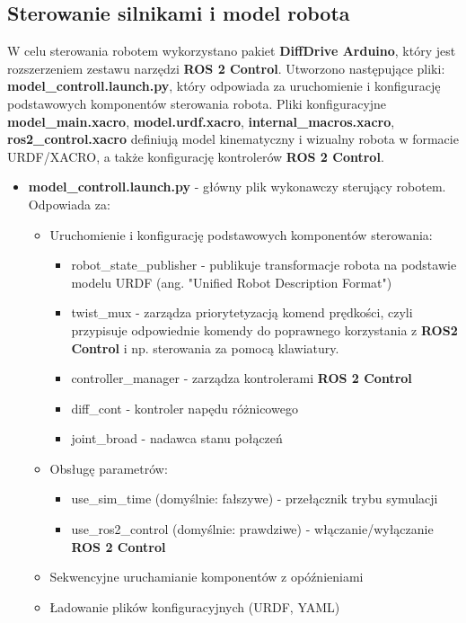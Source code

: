 \documentclass[a4paper,twoside,12pt]{book}
\begin{document}
\subsection{Sterowanie silnikami i model robota}
W celu sterowania robotem wykorzystano pakiet  \textbf{DiffDrive Arduino}, który jest rozszerzeniem zestawu narzędzi \textbf{ROS 2 Control}. \newline
Utworzono następujące pliki:
\textbf{model\_controll.launch.py}, który odpowiada za uruchomienie i konfigurację podstawowych komponentów sterowania robota. 
Pliki konfiguracyjne \textbf{model\_main.xacro}, \textbf{model.urdf.xacro}, \textbf{internal\_macros.xacro}, \textbf{ros2\_control.xacro} definiują model kinematyczny i wizualny robota w formacie URDF/XACRO, a także konfigurację kontrolerów \textbf{ROS 2 Control}.
\newpage
\begin{itemize}

	\item \textbf{model\_controll.launch.py} - główny plik wykonawczy sterujący robotem. Odpowiada za:
		\begin{itemize}
			\item Uruchomienie i konfigurację podstawowych komponentów sterowania:
			\begin{itemize}
				\item robot\_state\_publisher - publikuje transformacje robota na podstawie modelu URDF (ang. "Unified Robot Description Format")
				\item twist\_mux - zarządza priorytetyzacją komend prędkości, czyli przypisuje odpowiednie komendy do poprawnego korzystania z \textbf{ROS2 Control} i np. sterowania za pomocą klawiatury.
				\item controller\_manager - zarządza kontrolerami \textbf{ROS 2 Control} 
				\item diff\_cont - kontroler napędu różnicowego
				\item joint\_broad - nadawca stanu połączeń
			\end{itemize}
		
			\item Obsługę parametrów:
			\begin{itemize}
				\item use\_sim\_time (domyślnie: fałszywe) - przełącznik trybu symulacji
				\item use\_ros2\_control (domyślnie: prawdziwe) - włączanie/wyłączanie \textbf{ROS 2 Control} 
			\end{itemize}
			\item Sekwencyjne uruchamianie komponentów z opóźnieniami
			\item Ładowanie plików konfiguracyjnych (URDF, YAML)
		\end{itemize}


\end{itemize}
\end{document}
